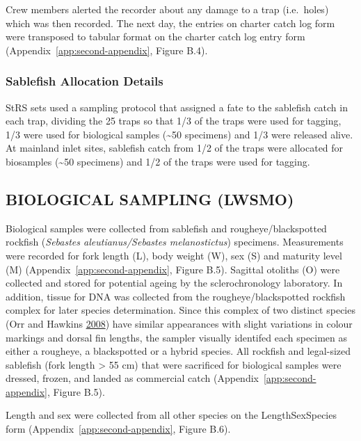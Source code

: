 \documentclass[12pt]{article}\usepackage[]{graphicx}\usepackage[]{color}
\begin{document}
Crew members alerted the recorder about any damage to a trap (i.e.~holes) which was then recorded. The next day, the entries on charter catch log form were transposed to tabular format on the charter catch log entry form (Appendix~\ref{app:second-appendix}, Figure B.4).

\hypertarget{sablefish-allocation-details}{%
\subsubsection{Sablefish Allocation Details}\label{sablefish-allocation-details}}

StRS sets used a sampling protocol that assigned a fate to the sablefish catch in each trap, dividing the 25 traps so that 1/3 of the traps were used for tagging, 1/3 were used for biological samples (\textasciitilde50 specimens) and 1/3 were released alive. At mainland inlet sites, sablefish catch from 1/2 of the traps were allocated for biosamples (\textasciitilde50 specimens) and 1/2 of the traps were used for tagging.

\hypertarget{biological-sampling-lwsmo}{%
\subsection{BIOLOGICAL SAMPLING (LWSMO)}\label{biological-sampling-lwsmo}}

Biological samples were collected from sablefish and rougheye/blackspotted rockfish (\emph{Sebastes aleutianus/Sebastes melanostictus}) specimens. Measurements were recorded for fork length (L), body weight (W), sex (S) and maturity level (M) (Appendix~\ref{app:second-appendix}, Figure B.5). Sagittal otoliths (O) were collected and stored for potential ageing by the sclerochronology laboratory. In addition, tissue for DNA was collected from the rougheye/blackspotted rockfish complex for later species determination. Since this complex of two distinct species (Orr and Hawkins \protect\hyperlink{ref-Orr2008}{2008}) have similar appearances with slight variations in colour markings and dorsal fin lengths, the sampler visually identifed each specimen as either a rougheye, a blackspotted or a hybrid species. All rockfish and legal-sized sablefish (fork length \textgreater{} 55 cm) that were sacrificed for biological samples were dressed, frozen, and landed as commercial catch (Appendix~\ref{app:second-appendix}, Figure B.5).

Length and sex were collected from all other species on the LengthSexSpecies form (Appendix~\ref{app:second-appendix}, Figure B.6).
\end{document}
